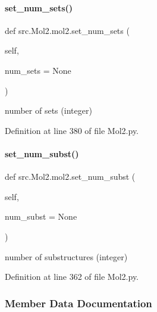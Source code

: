 \mbox{\label{classsrc_1_1Mol2_1_1mol2_af026b487fca3b9bb0546233874d48aab}} 
\paragraph{\texorpdfstring{set\+\_\+num\+\_\+sets()}{set\_num\_sets()}}
{\footnotesize\ttfamily def src.\+Mol2.\+mol2.\+set\+\_\+num\+\_\+sets (\begin{DoxyParamCaption}\item[{}]{self,  }\item[{}]{num\+\_\+sets = {\ttfamily None} }\end{DoxyParamCaption})}



number of sets (integer) 



Definition at line 380 of file Mol2.\+py.

\mbox{\label{classsrc_1_1Mol2_1_1mol2_ad2a26c5f15a9f978a21f197eefd1bdf5}} 
\paragraph{\texorpdfstring{set\+\_\+num\+\_\+subst()}{set\_num\_subst()}}
{\footnotesize\ttfamily def src.\+Mol2.\+mol2.\+set\+\_\+num\+\_\+subst (\begin{DoxyParamCaption}\item[{}]{self,  }\item[{}]{num\+\_\+subst = {\ttfamily None} }\end{DoxyParamCaption})}



number of substructures (integer) 



Definition at line 362 of file Mol2.\+py.



\subsubsection{Member Data Documentation}
\mbox{\label{classsrc_1_1Mol2_1_1mol2_a09aaa9a674c219d57217d8fa49121d87}} 
